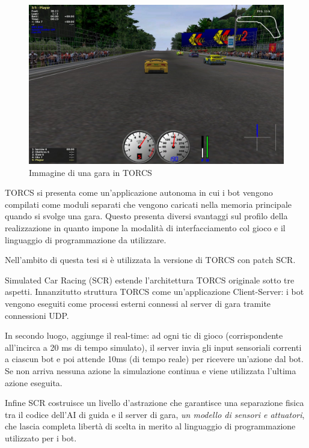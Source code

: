 \begin{figure}[hb]
    \centering
    \includegraphics[width = 5in]{Figures/Chapter3/torcs_game.jpg}
    \caption{Immagine di una gara in TORCS}
    \label{fig:torcsgame}
\end{figure}

TORCS si presenta come un'applicazione autonoma in cui i bot vengono compilati come moduli separati che vengono caricati nella memoria principale quando si svolge una gara. Questo presenta diversi svantaggi sul profilo della realizzazione in quanto impone la modalità di interfacciamento col gioco e il linguaggio di programmazione da utilizzare.
\newline

Nell'ambito di questa tesi si è utilizzata la versione di TORCS con patch SCR.
\newline

Simulated Car Racing (SCR)\cite{scrloiaconoPaper} estende l'architettura TORCS originale sotto tre aspetti. Innanzitutto struttura TORCS come un'applicazione Client-Server: i bot vengono eseguiti come processi esterni connessi al server di gara tramite connessioni UDP. 

In secondo luogo, aggiunge il real-time: ad ogni tic di gioco (corrispondente all'incirca a 20 ms di tempo simulato), il server invia gli input sensoriali correnti a ciascun bot
e poi attende 10ms (di tempo reale) per ricevere un'azione dal bot. Se non arriva nessuna azione la simulazione continua e viene utilizzata l'ultima azione eseguita. 

Infine SCR costruisce un livello d'astrazione che garantisce una separazione fisica tra il codice dell'AI di guida  e il server di gara, \textit{un modello di sensori e attuatori}, che lascia completa libertà di scelta in merito al linguaggio di programmazione utilizzato per i bot.
\newline

